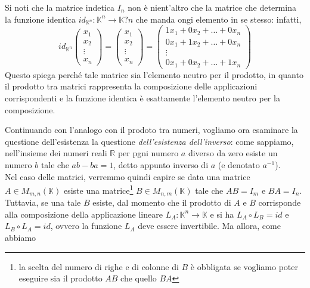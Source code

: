 \begin{osservazione}
  Si noti che la matrice indetica $I_n$ non è nient'altro che la matrice che determina la
  funzione identica $id_{\mathbb{K}^n}:\mathbb{K}^n\to \mathbb{K}?n$ che manda ongi elemento in se
  stesso: infatti,
  \begin{equation}
    id_{\mathbb{K}^n}
    \begin{pmatrix}
      x_1\\
      x_2\\
      \vdots\\
      x_n
    \end{pmatrix}=
    \begin{pmatrix}
      x_1\\
      x_2\\
      \vdots\\
      x_n
    \end{pmatrix}=
    \begin{pmatrix}
      1x_1+0x_2+\dots+0x_n\\
      0x_1+1x_2+\dots+0x_n\\
      \vdots\\
      0x_1+0x_2+\dots+1x_n
    \end{pmatrix}
  \end{equation}
  Questo spiega perché tale matrice sia l'elemento neutro per il prodotto, in quanto il
  prodotto tra matrici rappresenta la composizione delle applicazioni corrispondenti e la funzione identica è
  esattamente l'elemento neutro per la composizione.
\end{osservazione}
Continuando con l'analogo con il prodoto tra numeri, vogliamo ora esaminare la questione
dell'esistenza la questione \textit{dell'esistenza dell'inverso}: come sappiamo, nell'insieme dei numeri reali
$\mathbb{R}$ per pgni numero $a$ diverso da zero esiste un numero $b$ tale che $ab-ba=1$, detto appunto inverso
di $a$ (e denotato $a^{-1}$).\\
Nel caso delle matrici, verremmo quindi capire se data una matrice $A\in M_{m,n} (\mathbb{K})$ esiste una
matrice\footnote{la scelta del numero di righe e di colonne di $B$ è obbligata se vogliamo poter eseguire sia il
prodotto $AB$ che quello $BA$} $B\in M_{n,m}(\mathbb{K})$ tale che
$AB=I_m$ e $BA=I_n$. Tuttavia, se una tale $B$ esiste, dal momento che il prodotto di $A$
e $B$ corrisponde alla composizione della applicazione lineare $L_A:\mathbb{K}^n\to \mathbb{K}$ e si ha
$L_A\circ L_B=id$ e $L_B\circ L_A=id$, ovvero la funzione $L_A$ deve essere invertibile. Ma allora, come abbiamo
